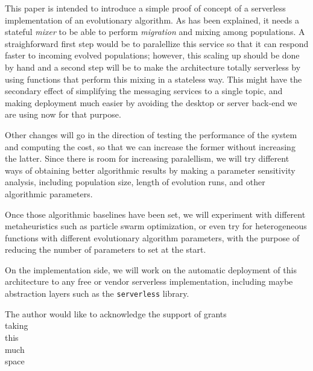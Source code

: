 \documentclass[sigconf]{acmart}
\begin{document}

This paper is intended to introduce a simple proof of concept of a
serverless implementation of an evolutionary algorithm. As has been
explained, it needs a stateful {\em mixer} to be able to perform {\em
  migration} and mixing among populations. A straighforward first step
would be to paralellize this service so that it can respond faster to
incoming evolved populations; however, this scaling up should be done
by hand and a second step will be to make the architecture totally
serverless by using functions that perform this mixing in a stateless
way. This might have the secondary effect of simplifying the messaging
services to a single topic, and making deployment much easier by
avoiding the desktop or server back-end we are using now for that
purpose.

Other changes will go in the direction of testing the performance of
the system and computing the cost, so that we can increase the former
without increasing the latter. Since there is room for increasing
paralellism, we will try different ways of obtaining better
algorithmic results by making a parameter sensitivity analysis,
including population size, length of evolution runs, and other
algorithmic parameters.

Once those algorithmic baselines have been set, we will experiment
with different metaheuristics such as particle swarm optimization, or
even try for heterogeneous functions with different evolutionary
algorithm parameters, with the purpose of reducing the number of
parameters to set at the start.

On the implementation side, we will work on the automatic deployment
of this architecture to any free or vendor serverless implementation,
including maybe abstraction layers such as the {\tt serverless}
library. 




\begin{acks}

  The author would like to acknowledge the support of grants\\
  taking\\
  this\\
  much\\
  space\\

\end{acks}




\end{document}
